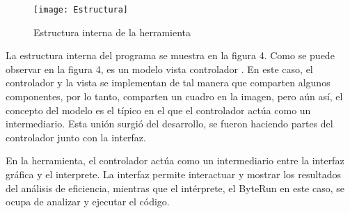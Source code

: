 \begin{figure}[H]
\centering
\texttt{[image: Estructura]}
\caption{Estructura interna de la herramienta}
\end{figure}

La estructura interna del programa se muestra en la figura 4. Como se puede observar en la figura 4, es un modelo vista controlador . En este caso, el controlador y la vista se implementan de tal manera que comparten algunos componentes, por lo tanto, comparten un cuadro en la imagen, pero aún así, el concepto del modelo es el típico en el que el controlador actúa como un intermediario. Esta unión surgió del desarrollo, se fueron haciendo partes del controlador junto con la interfaz.

En la herramienta, el controlador actúa como un intermediario entre la interfaz gráfica y el interprete. La interfaz permite interactuar y mostrar los resultados del análisis de eficiencia, mientras que el intérprete, el ByteRun en este caso, se ocupa de analizar y ejecutar el código.
